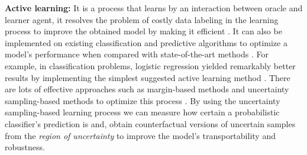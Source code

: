 \textbf{Active learning: }It is a process that learns by an interaction
between oracle and learner agent, it resolves the problem of costly
data labeling in the learning process to improve the obtained model
by making it efficient \cite{cohn1996active,nissim2016improving}.
It can also be implemented on existing classification and predictive
algorithms to optimize a model's performance when compared with state-of-the-art
methods \cite{collet2014active}. For example, in classification problems,
logistic regression yielded remarkably better results by implementing
the simplest suggested active learning method \cite{lewis1994sequential,settles_12_active,yang2018benchmark}.
There are lots of effective approaches such as margin-based methods
\cite{ducoffe2018adversarial} and uncertainty sampling-based methods
to optimize this process \cite{gal2017deep,settles2007multiple}.
By using the uncertainty sampling-based learning process we can measure
how certain a probabilistic classifier's prediction is and, obtain
counterfactual versions of uncertain samples from the \textit{region
of uncertainty} to improve the model's transportability and robustness.
